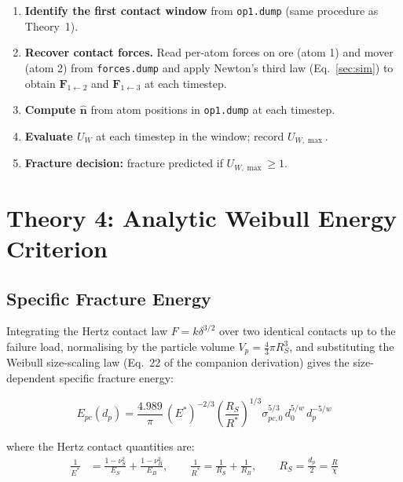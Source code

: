 \documentclass{article}
\begin{document}
\begin{enumerate}
    \item \textbf{Identify the first contact window} from \texttt{op1.dump}
          (same procedure as Theory~1).

    \item \textbf{Recover contact forces.}
          Read per-atom forces on ore (atom 1) and mover (atom 2) from
          \texttt{forces.dump} and apply Newton's third law
          (Eq.~\ref{sec:sim}) to obtain $\mathbf{F}_{1\leftarrow2}$
          and $\mathbf{F}_{1\leftarrow3}$ at each timestep.

    \item \textbf{Compute $\hat{\mathbf{n}}$} from atom positions in
          \texttt{op1.dump} at each timestep.

    \item \textbf{Evaluate $U_W$} at each timestep in the window;
          record $U_{W,\max}$.

    \item \textbf{Fracture decision:} fracture predicted if
          $U_{W,\max} \geq 1$.
\end{enumerate}

\section{Theory 4: Analytic Weibull Energy Criterion}
\label{sec:theory4}

\subsection{Specific Fracture Energy}

Integrating the Hertz contact law $F = k\delta^{3/2}$ over two identical contacts
up to the failure load, normalising by the particle volume $V_p = \tfrac{4}{3}\pi R_S^3$,
and substituting the Weibull size-scaling law (Eq.~22 of the companion derivation) gives
the size-dependent specific fracture energy:

\begin{equation}
    E_{pc}(d_p) = \frac{4.989}{\pi}\,(E^*)^{-2/3}
                  \left(\frac{R_S}{R^*}\right)^{\!1/3}
                  \sigma_{pc,0}^{5/3}\,d_0^{5/w}\,d_p^{-5/w}
\end{equation}

where the Hertz contact quantities are:
\begin{align}
    \frac{1}{E^*} &= \frac{1-\nu_S^2}{E_S} + \frac{1-\nu_B^2}{E_B}, \qquad
    \frac{1}{R^*}  = \frac{1}{R_S} + \frac{1}{R_B}, \qquad
    R_S = \frac{d_p}{2} = \frac{R}{\chi}
\end{align}
\end{document}
